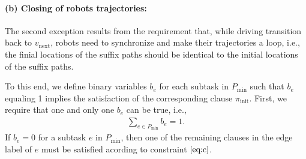 \documentclass[Afour,sageh,times]{sagej}
\newcommand{\auto}[1]{\ccalA_{\textup{#1}}}
\newcommand{\vertex}[1]{v_{\textup{#1}}}
\begin{document}
{{%
\paragraph{\quad (b) Closing of robots trajectories:} The second exception results from the requirement that, while driving transition back to $v_{\text{next}}$, robots need to synchronize and make their trajectories a loop, i.e., the finial locations of the suffix paths should be identical to the initial locations of the suffix paths.

To this end, we define binary variables $b_e$ for each subtask in $P_{\text{min}}$ such that $b_e$ equaling 1 implies the satisfaction of the corresponding clause $\pi_{\text{init}}$. First, we require that one  and only one $b_e$ can be true, i.e.,
\begin{align}
  \sum_{e \in P_{\text{min}}} b_e = 1.
\end{align}
If $b_e=0$ for a subtask $e$ in $P_{\text{min}}$, then one of the remaining clauses in the edge label of $e$ must be satisfied acording to constraint $\eqref{eq:c}$.

}}
\end{document}
